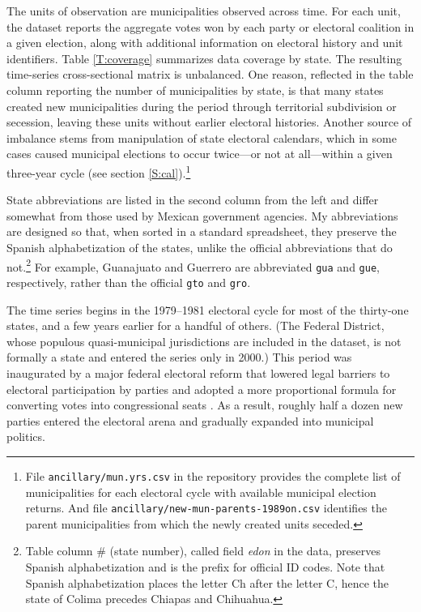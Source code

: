 \documentclass[letter,12pt]{article}
\begin{document}
The units of observation are municipalities observed across time. For each unit, the dataset reports the aggregate votes won by each party or electoral coalition in a given election, along with additional information on electoral history and unit identifiers. Table \ref{T:coverage} summarizes data coverage by state. The resulting time-series cross-sectional matrix is unbalanced. One reason, reflected in the table column reporting the number of municipalities by state, is that many states created new municipalities during the period through territorial subdivision or secession, leaving these units without earlier electoral histories. Another source of imbalance stems from manipulation of state electoral calendars, which in some cases caused municipal elections to occur twice---or not at all---within a given three-year cycle (see section \ref{S:cal}).\footnote{File \verb|ancillary/mun.yrs.csv| in the repository provides the complete list of municipalities for each electoral cycle with available municipal election returns. And file \verb|ancillary/new-mun-parents-1989on.csv| identifies the parent municipalities from which the newly created units seceded.}

State abbreviations are listed in the second column from the left and differ somewhat from those used by Mexican government agencies. My abbreviations are designed so that, when sorted in a standard spreadsheet, they preserve the Spanish alphabetization of the states, unlike the official abbreviations that do not.\footnote{Table column \# (state number), called field \emph{edon} in the data, preserves Spanish alphabetization and is the prefix for official ID codes. Note that Spanish alphabetization places the letter Ch after the letter C, hence the state of Colima precedes Chiapas and Chihuahua.} For example, Guanajuato and Guerrero are abbreviated \verb|gua| and \verb|gue|, respectively, rather than the official \verb|gto| and \verb|gro|.

The time series begins in the 1979--1981 electoral cycle for most of the thirty-one states, and a few years earlier for a handful of others. (The Federal District, whose populous quasi-municipal jurisdictions are included in the dataset, is not formally a state and entered the series only in 2000.) This period was inaugurated by a major federal electoral reform that lowered legal barriers to electoral participation by parties and adopted a more proportional formula for converting votes into congressional seats \citep[:116]{molinar.1991a}. As a result, roughly half a dozen new parties entered the electoral arena and gradually expanded into municipal politics.  
\end{document}
